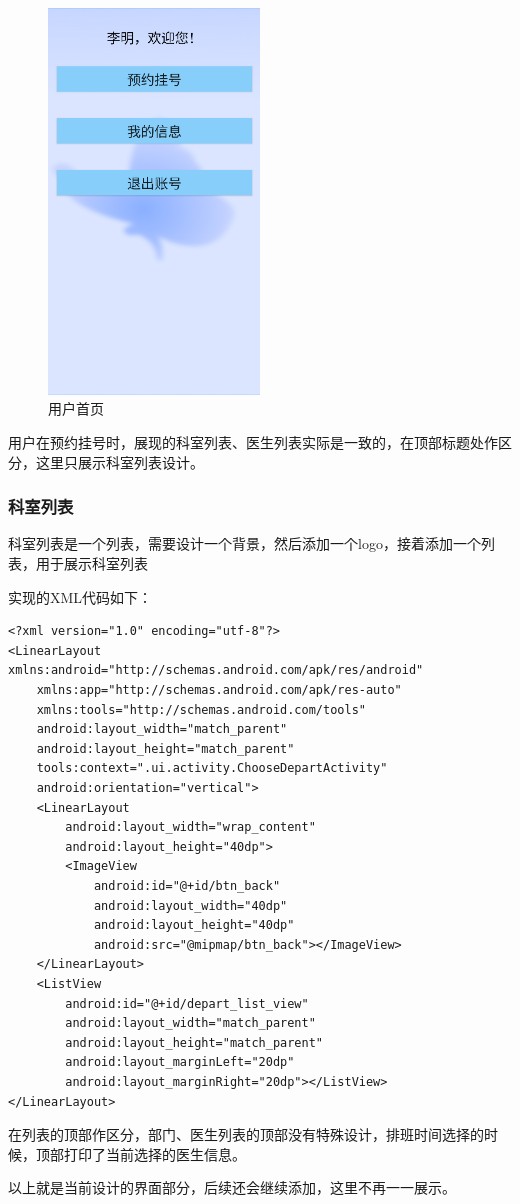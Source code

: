 \documentclass[UTF8,12pt]{article}
\begin{document}
\begin{figure}[htbp]
    \centering
    \includegraphics[width=0.5\textwidth]{imgs/5.png}
    \caption{用户首页}
    \label{fig:index}
\end{figure}

用户在预约挂号时，展现的科室列表、医生列表实际是一致的，在顶部标题处作区分，这里只展示科室列表设计。

\subsubsection{科室列表}
科室列表是一个列表，需要设计一个背景，然后添加一个logo，接着添加一个列表，用于展示科室列表

实现的XML代码如下：

\newpage

\begin{lstlisting}
<?xml version="1.0" encoding="utf-8"?>
<LinearLayout xmlns:android="http://schemas.android.com/apk/res/android"
    xmlns:app="http://schemas.android.com/apk/res-auto"
    xmlns:tools="http://schemas.android.com/tools"
    android:layout_width="match_parent"
    android:layout_height="match_parent"
    tools:context=".ui.activity.ChooseDepartActivity"
    android:orientation="vertical">
    <LinearLayout
        android:layout_width="wrap_content"
        android:layout_height="40dp">
        <ImageView
            android:id="@+id/btn_back"
            android:layout_width="40dp"
            android:layout_height="40dp"
            android:src="@mipmap/btn_back"></ImageView>
    </LinearLayout>
    <ListView
        android:id="@+id/depart_list_view"
        android:layout_width="match_parent"
        android:layout_height="match_parent"
        android:layout_marginLeft="20dp"
        android:layout_marginRight="20dp"></ListView>
</LinearLayout>
\end{lstlisting}

在列表的顶部作区分，部门、医生列表的顶部没有特殊设计，排班时间选择的时候，顶部打印了当前选择的医生信息。

以上就是当前设计的界面部分，后续还会继续添加，这里不再一一展示。
\end{document}
